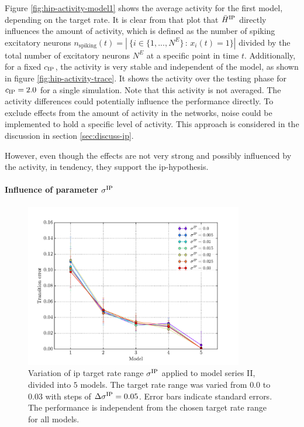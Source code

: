 Figure \ref{fig:hip-activity-model1} shows the average activity for the first model, depending on the target rate. It is clear from that plot that $\bar H^{\text{IP}}$ directly influences the amount of activity, which is defined as the number of spiking excitatory neurons $n_{\text{spiking}}(t) = |\ \{ i \in \{1, ..., N^E\} \,:\, x_i(t) = 1\} |$ divided by the total number of excitatory neurons $N^E$ at a specific point in time $t$. Additionally, for a fixed $c_{\text{IP}}$, the activity is very stable and independent of the model, as shown in figure \ref{fig:hip-activity-trace}. It shows the activity over the testing phase for $c_{\text{IP}} = 2.0$ for a single simulation. Note that this activity is not averaged. The activity differences could potentially influence the performance directly. To exclude effects from the amount of activity in the networks, noise could be implemented to hold a specific level of activity. This approach is considered in the discussion in section \ref{sec:discuss-ip}. 

However, even though the effects are not very strong and possibly influenced by the activity, in tendency, they support the \acs{ip}-hypothesis.

\paragraph{Influence of parameter $\sigma^{\text{IP}}$}

\begin{figure}[!b]
	\centering
	\includegraphics[width=0.85\textwidth]{results/h_ip_range}
	\caption[Influence of the IP target rate range]{Variation of \acs{ip} target rate range $\sigma^{\text{IP}}$ applied to model series II, divided into $5$ models. The target rate range was varied from $0.0$ to $0.03$ with steps of $\Delta \sigma^{\text{IP}} = 0.05$. Error bars indicate standard errors. The performance is independent from the chosen target rate range for all models.}
	\label{fig:hip-range}
\end{figure}

